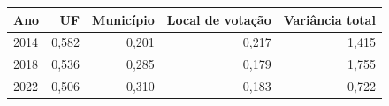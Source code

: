 \begin{tabular}{lrrrr}
\toprule
Ano & UF & Município & Local de votação & Variância total \\
\midrule
2014 & 0{,}582 & 0{,}201 & 0{,}217 & 1{,}415 \\
2018 & 0{,}536 & 0{,}285 & 0{,}179 & 1{,}755 \\
2022 & 0{,}506 & 0{,}310 & 0{,}183 & 0{,}722 \\
\bottomrule
\end{tabular}
